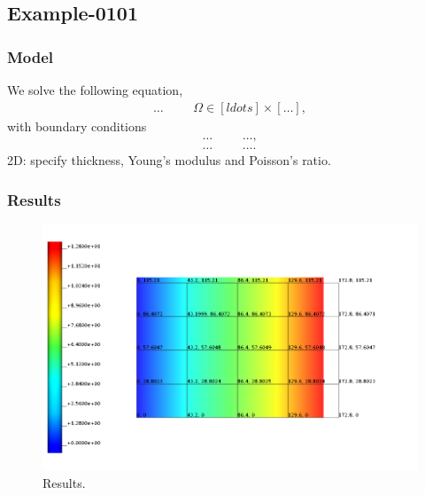 %
\subsection{Example-0101}
%
%
\subsubsection{Model}
%
We solve the following equation,
%
\begin{align}
    \ldots & &&\Omega \in [ldots] \times [\ldots],
\end{align}
%
with boundary conditions
%
\begin{align}
    \ldots & && \ldots, \\
    \ldots & && \ldots.
\end{align}
%
2D: specify thickness, Young's modulus and Poisson's ratio.
%
%
\subsubsection{Results}
%
\begin{figure}[h!]
    \centering 
    \includegraphics[width=\columnwidth]{examples/example-0101/figures/example.png} 
    \caption{Results.}
    \label{example-0101-fig}
\end{figure}
%
